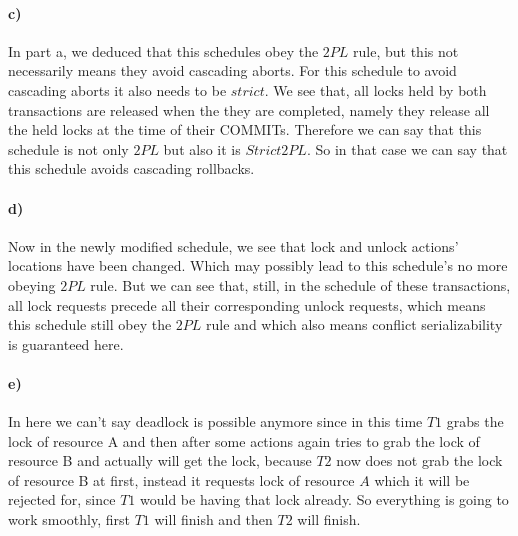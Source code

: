 \documentclass[a4paper,12pt]{article}
\begin{document}
\paragraph{c)} In part a, we deduced that this schedules obey the $2PL$ rule, but this not necessarily means they avoid cascading aborts. For this schedule to avoid cascading aborts it also needs to be $strict$. We see that, all locks held by both transactions are released when the they are completed, namely they release all the held locks at the time of their COMMITs. Therefore we can say that this schedule is not only $2PL$ but also it is $Strict 2PL$. So in that case we can say that this schedule avoids cascading rollbacks.

\paragraph{d)} Now in the newly modified schedule, we see that lock and unlock actions' locations have been changed. Which may possibly lead to this schedule's no more obeying $2PL$ rule. But we can see that, still, in the schedule of these transactions, all lock requests precede all their corresponding unlock requests, which means this schedule still obey the $2PL$ rule and which also means conflict serializability is guaranteed here.

\paragraph{e)} In here we can't say deadlock is possible anymore since in this time $T1$ grabs the lock of resource A and then after some actions again tries to grab the lock of resource B and actually will get the lock, because  $T2$ now does not grab the lock of resource B at first, instead it requests lock of resource $A$ which it will be rejected for, since $T1$ would be having that lock already. So everything is going to work smoothly, first $T1$ will finish and then $T2$ will finish.
\end{document}
